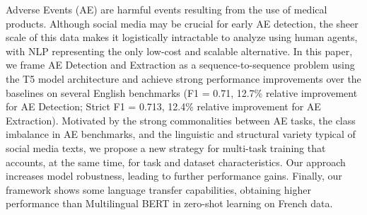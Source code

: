 Adverse Events (AE) are harmful events resulting from the use of medical products. Although social media may be crucial for early AE detection, the sheer scale of this data makes it logistically intractable to analyze using human agents, with NLP representing the only low-cost and scalable alternative. In this paper, we frame AE Detection and Extraction as a sequence-to-sequence problem using the T5 model architecture and achieve strong performance improvements over the baselines on several English benchmarks (F1 = 0.71, 12.7\% relative improvement for AE Detection; Strict F1 = 0.713, 12.4\% relative improvement for AE Extraction). Motivated by the strong commonalities between AE tasks, the class imbalance in AE benchmarks, and the linguistic and structural variety typical of social media texts, we propose a new strategy for multi-task training that accounts, at the same time, for task and dataset characteristics. Our approach increases model robustness, leading to further performance gains. Finally, our framework shows some language transfer capabilities, obtaining higher performance than Multilingual BERT in zero-shot learning on French data.
